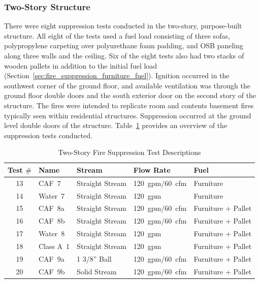 \documentclass[12pt,oneside]{book}
\begin{document}
\subsubsection*{Two-Story Structure}
\label{sec:fire_supp_two}

There were eight suppression tests conducted in the two-story, purpose-built structure. All eight of the tests used a fuel load consisting of three sofas, polypropylene carpeting over polyurethane foam padding, and OSB paneling along three walls and the ceiling. Six of the eight tests also had two stacks of wooden pallets in addition to the initial fuel load (Section~\ref{sec:fire_suppression_furniture_fuel}). Ignition occurred in the southwest corner of the ground floor, and available ventilation was through the ground floor double doors and the south exterior door on the second story of the structure. The fires were intended to replicate room and contents basement fires typically seen within residential structures. Suppression occurred at the ground level double doors of the structure. Table~\ref{tab:Test_Descriptions_2} provides an overview of the suppression tests conducted.

\begin{table}[!ht]
\centering
\small
\caption{Two-Story Fire Suppression Test Descriptions}\label{tab:Test_Descriptions_2}
\begin{tabular}{cllll}
\toprule[1.5pt]
Test $\#$  & Name	& Stream			& Flow Rate		& Fuel                    \\
\midrule
 13  & CAF~7     &  Straight Stream  	&  120~gpm/60~cfm   & Furniture           \\
 14  & Water~7   &  Straight Stream  	&  120~gpm    		& Furniture           \\
 15  & CAF~8a    &  Straight Stream  	&  120~gpm/60~cfm   & Furniture + Pallet  \\
 16  & CAF~8b    &  Straight Stream  	&  120~gpm/60~cfm   & Furniture + Pallet  \\
 17  & Water~8   &  Straight Stream     &  120~gpm          & Furniture + Pallet  \\
 18  & Class A~1 &  Straight Stream  	&  120~gpm		    & Furniture + Pallet  \\
 19  & CAF~9a    &  1 3/8'' Ball    	&  120~gpm/60~cfm   & Furniture + Pallet  \\
 20  & CAF~9b    &  Solid Stream        &  120~gpm/60~cfm   & Furniture + Pallet  \\
\bottomrule[1.25pt]
\end{tabular}\par
\end{table}
  
\end{document}
